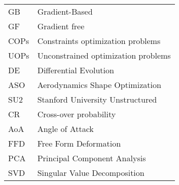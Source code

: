 \begin{longtable}[l]{l l}
GB & Gradient-Based\\
GF & Gradient free\\
COPs & Constraints optimization problems\\
UOPs & Unconstrained optimization problems\\
DE & Differential Evolution\\
ASO & Aerodynamics Shape Optimization\\
SU2 & Stanford University Unstructured\\
CR & Cross-over probability\\
AoA & Angle of Attack\\
FFD & Free Form Deformation\\
PCA & Principal Component Analysis\\
SVD & Singular Value Decomposition\\
\end{longtable}
